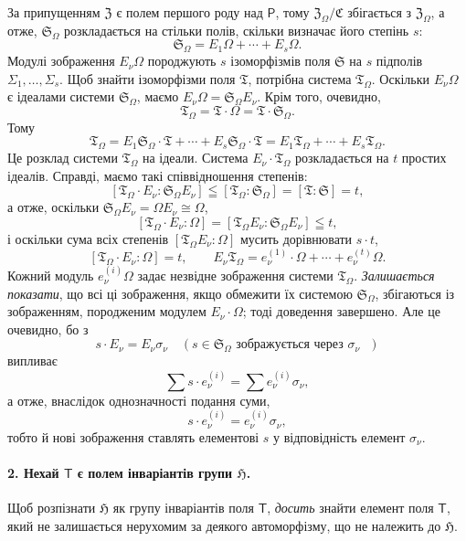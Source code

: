 \documentclass[11pt]{article}
\begin{document}
За припущенням \(\mathfrak Z\) є полем першого роду над \(\mathsf P\), тому \(\mathfrak Z_\Omega/\mathfrak C\) збігається з \(\mathfrak Z_\Omega\), а отже, \(\mathfrak S_\Omega\) розкладається на стільки полів, скільки визначає його степінь \(s\):
\[
\mathfrak S_\Omega = E_1\Omega+\cdots+E_s\Omega .
\]
Модулі зображення \(E_\nu\Omega\) породжують \(s\) ізоморфізмів поля \(\mathfrak S\) на \(s\) підполів \(\Sigma_1,\ldots,\Sigma_s\). Щоб знайти ізоморфізми поля \(\mathfrak T\), потрібна система \(\mathfrak T_\Omega\). Оскільки \(E_\nu\Omega\) є ідеалами системи \(\mathfrak S_\Omega\), маємо \(E_\nu\Omega=\mathfrak S_\Omega E_\nu\). Крім того, очевидно,
\[
\mathfrak T_\Omega=\mathfrak T\cdot\Omega=\mathfrak T\cdot\mathfrak S_\Omega .
\]
Тому
\[
\mathfrak T_\Omega
=E_1\mathfrak S_\Omega\cdot\mathfrak T+\cdots+E_s\mathfrak S_\Omega\cdot\mathfrak T
=E_1\mathfrak T_\Omega+\cdots+E_s\mathfrak T_\Omega .
\]
Це розклад системи \(\mathfrak T_\Omega\) на ідеали. Система \(E_\nu\cdot\mathfrak T_\Omega\) розкладається на \(t\) простих ідеалів. Справді, маємо такі співвідношення степенів:
\[
[\mathfrak T_\Omega\cdot E_\nu:\mathfrak S_\Omega E_\nu]
\leqq [\mathfrak T_\Omega:\mathfrak S_\Omega]=[\mathfrak T:\mathfrak S]=t,
\]
а отже, оскільки \(\mathfrak S_\Omega E_\nu=\Omega E_\nu\cong\Omega\),
\[
[\mathfrak T_\Omega\cdot E_\nu:\Omega]
=[\mathfrak T_\Omega E_\nu:\mathfrak S_\Omega E_\nu]\leqq t,
\]
і оскільки сума всіх степенів \([\mathfrak T_\Omega E_\nu:\Omega]\) мусить дорівнювати \(s\cdot t\),
\[
[\mathfrak T_\Omega\cdot E_\nu:\Omega]=t,\qquad
E_\nu\mathfrak T_\Omega=e_\nu^{(1)}\cdot\Omega+\cdots+e_\nu^{(t)}\Omega .
\]
Кожний модуль \(e_\nu^{(i)}\Omega\) задає незвідне зображення системи \(\mathfrak T_\Omega\). \emph{Залишається показати}, що всі ці зображення, якщо обмежити їх системою \(\mathfrak S_\Omega\), збігаються із зображенням, породженим модулем \(E_\nu\cdot\Omega\); тоді доведення завершено. Але це очевидно, бо з
\[
s\cdot E_\nu=E_\nu\sigma_\nu\quad
(s\in\mathfrak S_\Omega\text{ зображується через }\sigma_\nu\text{ })
\]
випливає
\[
\sum s\cdot e_\nu^{(i)}=\sum e_\nu^{(i)}\sigma_\nu,
\]
а отже, внаслідок однозначності подання суми,
\[
s\cdot e_\nu^{(i)}=e_\nu^{(i)}\sigma_\nu,
\]
тобто й нові зображення ставлять елементові \(s\) у відповідність елемент \(\sigma_\nu\).

\paragraph{2. Нехай \(\mathsf T\) є полем інваріантів групи \(\mathfrak H\).}
Щоб розпізнати \(\mathfrak H\) як групу інваріантів поля \(\mathsf T\), \emph{досить} знайти елемент поля \(\mathsf T\), який не залишається нерухомим за деякого автоморфізму, що не належить до \(\mathfrak H\).
\end{document}
